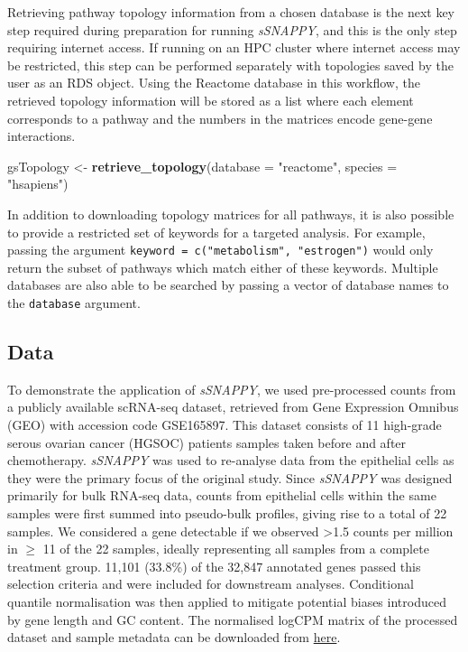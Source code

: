 \documentclass[9pt,a4paper,]{extarticle}
\newenvironment{Shaded}{\begin{snugshade}}{\end{snugshade}}
\newcommand{\AttributeTok}[1]{\textcolor[rgb]{0.13,0.29,0.53}{#1}}
\newcommand{\FunctionTok}[1]{\textcolor[rgb]{0.13,0.29,0.53}{\textbf{#1}}}
\newcommand{\NormalTok}[1]{#1}
\newcommand{\OtherTok}[1]{\textcolor[rgb]{0.56,0.35,0.01}{#1}}
\newcommand{\StringTok}[1]{\textcolor[rgb]{0.31,0.60,0.02}{#1}}
\begin{document}
Retrieving pathway topology information from a chosen database is the next key step required during preparation for running \emph{sSNAPPY}, and this is the only step requiring internet access.
If running on an HPC cluster where internet access may be restricted, this step can be performed separately with topologies saved by the user as an RDS object.
Using the Reactome database\citep{reactome2021} in this workflow, the retrieved topology information will be stored as a list where each element corresponds to a pathway and the numbers in the matrices encode gene-gene interactions.

\begin{Shaded}
\begin{Highlighting}[]
\NormalTok{gsTopology }\OtherTok{\textless{}{-}} \FunctionTok{retrieve\_topology}\NormalTok{(}\AttributeTok{database =} \StringTok{"reactome"}\NormalTok{, }\AttributeTok{species =} \StringTok{"hsapiens"}\NormalTok{)}
\end{Highlighting}
\end{Shaded}

In addition to downloading topology matrices for all pathways, it is also possible to provide a restricted set of keywords for a targeted analysis.
For example, passing the argument \texttt{keyword\ =\ c("metabolism",\ "estrogen")} would only return the subset of pathways which match either of these keywords.
Multiple databases are also able to be searched by passing a vector of database names to the \texttt{database} argument.

\hypertarget{data}{%
\subsection{Data}\label{data}}

To demonstrate the application of \emph{sSNAPPY}, we used pre-processed counts from a publicly available scRNA-seq dataset, retrieved from Gene Expression Omnibus (GEO) with accession code GSE165897.
This dataset consists of 11 high-grade serous ovarian cancer (HGSOC) patients samples taken before and after chemotherapy\citep{Zhang2022}.
\emph{sSNAPPY} was used to re-analyse data from the epithelial cells as they were the primary focus of the original study.
Since \emph{sSNAPPY} was designed primarily for bulk RNA-seq data, counts from epithelial cells within the same samples were first summed into pseudo-bulk profiles, giving rise to a total of 22 samples.
We considered a gene detectable if we observed \textgreater1.5 counts per million in \(\geq\) 11 of the 22 samples, ideally representing all samples from a complete treatment group.
11,101 (33.8\%) of the 32,847 annotated genes passed this selection criteria and were included for downstream analyses.
Conditional quantile normalisation\citep{Hansen2012} was then applied to mitigate potential biases introduced by gene length and GC content.
The normalised logCPM matrix of the processed dataset and sample metadata can be downloaded from \href{https://github.com/Wenjun-Liu/F1000_sSNAPPY_manuscript/tree/master/data}{here}.
\end{document}
